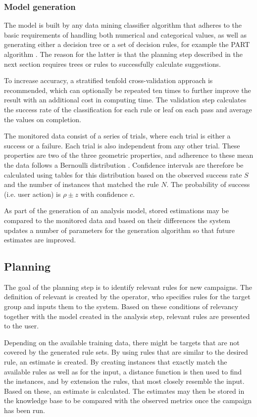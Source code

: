 \documentclass[10pt,twocolumn]{article}
\begin{document}
\subsubsection{Model generation}
The model is built by any data mining classifier algorithm that adheres to the basic requirements of handling both numerical and categorical values, as well as generating either a decision tree or a set of decision rules, for example the PART algorithm \citep{Frank1998}. The reason for the latter is that the planning step described in the next section requires trees or rules to successfully calculate suggestions.

To increase accuracy, a stratified tenfold cross-validation approach is recommended, which can optionally be repeated ten times to further improve the result with an additional cost in computing time. The validation step calculates the success rate of the classification for each rule or leaf on each pass and average the values on completion.

The monitored data consist of a series of trials, where each trial is either a success or a failure. Each trial is also independent from any other trial. These properties are two of the three geometric properties, and adherence to these mean the data follows a Bernoulli distribution \citep{Milton2002}. Confidence intervals are therefore be calculated using tables for this distribution \citep[chap. 5]{Witten2011} based on the observed success rate \(S\) and the number of instances that matched the rule \(N\). The probability of success (i.e. user action) is \(\rho \pm z\) with confidence \(c\).

As part of the generation of an analysis model, stored estimations may be compared to the monitored data and based on their differences the system updates a number of parameters for the generation algorithm so that future estimates are improved.

\subsection{Planning}
The goal of the planning step is to identify relevant rules for new campaigns. The definition of relevant is created by the operator, who specifies rules for the target group and inputs them to the system. Based on these conditions of relevancy together with the model created in the analysis step, relevant rules are presented to the user.

Depending on the available training data, there might be targets that are not covered by the generated rule sets. By using rules that are similar to the desired rule, an estimate is created. By creating instances that exactly match the available rules as well as for the input, a distance function is then used to find the instances, and by extension the rules, that most closely resemble the input. Based on these, an estimate is calculated. The estimates may then be stored in the knowledge base to be compared with the observed metrics once the campaign has been run.
\end{document}
